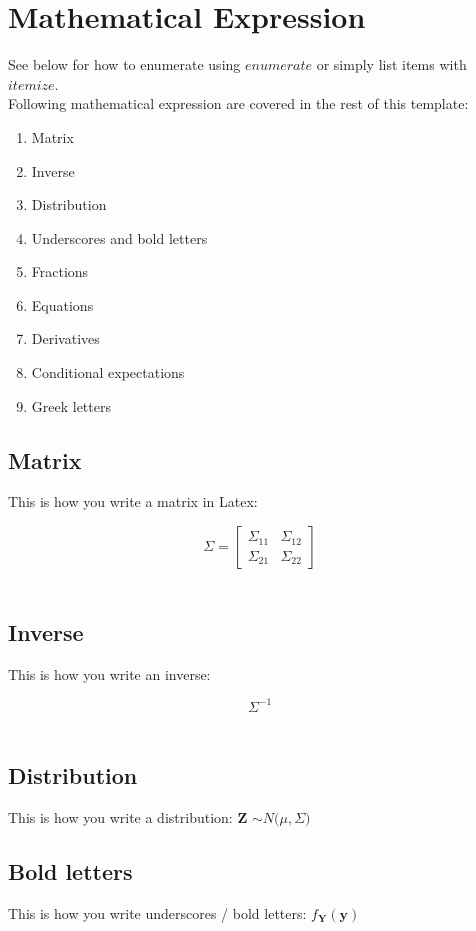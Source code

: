 \documentclass[1.5,a4,12pt]{article}
\begin{document}
\section{Mathematical Expression}

See below for how to enumerate using $\textit{enumerate}$ or simply list items with $\textit{itemize}$.  \\

\noindent Following mathematical expression are covered in the rest of this template:
\begin{enumerate}
\item Matrix
\item Inverse
\item Distribution
\item Underscores and bold letters
\item Fractions
\item Equations
\item Derivatives
\item Conditional expectations 
\item Greek letters \\
\end{enumerate}

\subsection*{Matrix}
This is how you write a matrix in Latex:

$$ 
 \Sigma  = 
\begin{bmatrix}
\Sigma_{11} & \Sigma_{12} \\ 
\Sigma_{21} & \Sigma_{22}
\end{bmatrix}
$$ \\

\subsection*{Inverse}	
This is how you write an inverse:

$$ \Sigma^{-1}  $$ \\

\subsection*{Distribution}
This is how you write a distribution: $\textbf{Z}$ $\sim N \Big( \mu,  \Sigma  \Big)$ \\

\subsection*{Bold letters}
This is how you write underscores / bold letters:
$	f_{\mathbf{Y}}(\mathbf{y}) $ \\
\end{document}
